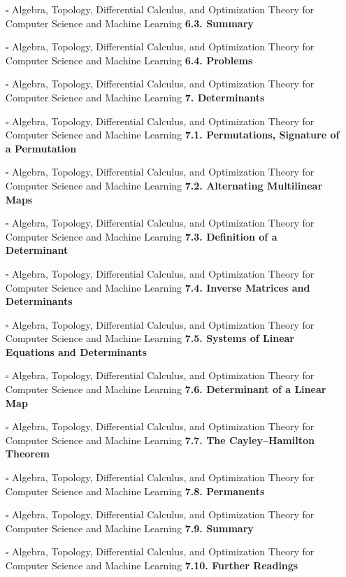 \documentclass[a4, landscape, 12pt]{article}
\newcommand{\checkbox}{$\square$}%
\begin{document}
\begin{itemize}
{}
\item [\checkbox]  Algebra, Topology, Differential Calculus, and Optimization Theory for Computer Science and Machine Learning \textbf{ 6.3. Summary
}
\item [\checkbox]  Algebra, Topology, Differential Calculus, and Optimization Theory for Computer Science and Machine Learning \textbf{ 6.4. Problems
}
\item [\checkbox]  Algebra, Topology, Differential Calculus, and Optimization Theory for Computer Science and Machine Learning \textbf{ 7. Determinants
}
\item [\checkbox]  Algebra, Topology, Differential Calculus, and Optimization Theory for Computer Science and Machine Learning \textbf{ 7.1. Permutations, Signature of a Permutation
}
\item [\checkbox]  Algebra, Topology, Differential Calculus, and Optimization Theory for Computer Science and Machine Learning \textbf{ 7.2. Alternating Multilinear Maps
}
\item [\checkbox]  Algebra, Topology, Differential Calculus, and Optimization Theory for Computer Science and Machine Learning \textbf{ 7.3. Definition of a Determinant
}
\item [\checkbox]  Algebra, Topology, Differential Calculus, and Optimization Theory for Computer Science and Machine Learning \textbf{ 7.4. Inverse Matrices and Determinants
}
\item [\checkbox]  Algebra, Topology, Differential Calculus, and Optimization Theory for Computer Science and Machine Learning \textbf{ 7.5. Systems of Linear Equations and Determinants
}
\item [\checkbox]  Algebra, Topology, Differential Calculus, and Optimization Theory for Computer Science and Machine Learning \textbf{ 7.6. Determinant of a Linear Map
}
\item [\checkbox]  Algebra, Topology, Differential Calculus, and Optimization Theory for Computer Science and Machine Learning \textbf{ 7.7. The Cayley–Hamilton Theorem
}
\item [\checkbox]  Algebra, Topology, Differential Calculus, and Optimization Theory for Computer Science and Machine Learning \textbf{ 7.8. Permanents
}
\item [\checkbox]  Algebra, Topology, Differential Calculus, and Optimization Theory for Computer Science and Machine Learning \textbf{ 7.9. Summary
}
\item [\checkbox]  Algebra, Topology, Differential Calculus, and Optimization Theory for Computer Science and Machine Learning \textbf{ 7.10. Further Readings
}
\end{itemize}
\end{document}
